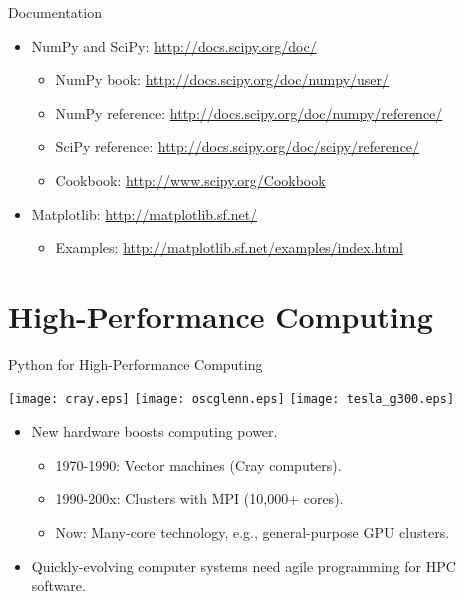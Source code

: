 \documentclass[dvips,xcolor=pst]{beamer}
\begin{document}
\begin{frame}{
%
Documentation
%
}
\begin{itemize} \large
  \item NumPy and SciPy: \url{http://docs.scipy.org/doc/}
  \begin{itemize} \large
    \item NumPy book: \url{http://docs.scipy.org/doc/numpy/user/}
    \item NumPy reference: \url{http://docs.scipy.org/doc/numpy/reference/}
    \item SciPy reference: \url{http://docs.scipy.org/doc/scipy/reference/}
    \item Cookbook: \url{http://www.scipy.org/Cookbook}
  \end{itemize}
  \item Matplotlib: \url{http://matplotlib.sf.net/}
  \begin{itemize} \large
    \item Examples: \url{http://matplotlib.sf.net/examples/index.html}
  \end{itemize}
\end{itemize}
\end{frame}

\section{
High-Performance Computing
}

\begin{frame}{
%
Python for High-Performance Computing
%
}
\begin{center}
  \texttt{[image: cray.eps]}
  \hspace{0.01\textwidth}
  \texttt{[image: oscglenn.eps]}
  \hspace{0.01\textwidth}
  \texttt{[image: tesla\_g300.eps]}
\end{center}
\begin{itemize} \large
  \item New hardware boosts computing power.
  \begin{itemize} \large
    \item 1970-1990: Vector machines (Cray computers).
    \item 1990-200x: Clusters with MPI (10,000+ cores).
    \item Now: Many-core technology, e.g., general-purpose GPU clusters.
  \end{itemize}
  \item Quickly-evolving computer systems need agile programming for HPC
  software.
\end{itemize}
\end{frame}
\end{document}
